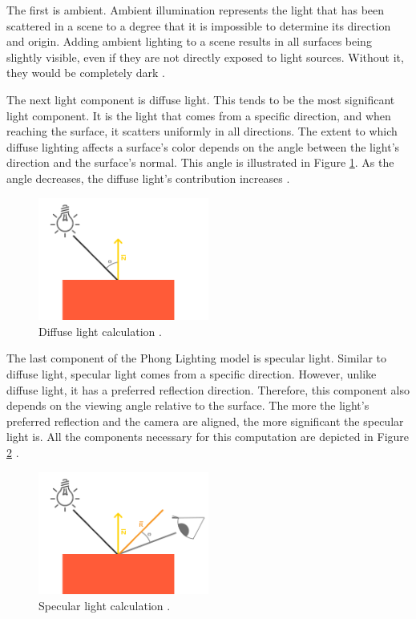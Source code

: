 \documentclass[
  digital,     %
  oneside,     %
  nosansbold,  %
  nocolorbold, %
  lof,         %
  lot,         %
]{fithesis4}
\begin{document}
The first is ambient. Ambient illumination represents the light that has been scattered
in a scene to a degree that it is impossible to determine its direction and origin.
Adding ambient lighting to a scene results in all surfaces being slightly visible,
even if they are not directly exposed
to light sources. Without it, they would be completely dark \cite[p.208]{opengl-book}.

The next light component is diffuse light. This tends to be the most significant light component.
It is the light that comes from a specific direction, and when reaching the surface,
it scatters uniformly in all directions. The extent to which diffuse lighting affects
a surface's color depends on the angle between the light's direction and the surface's normal.
This angle is illustrated in Figure \ref{fig:diffuse}. As the angle decreases,
the diffuse light's contribution increases \cite{phong}\cite[p.208]{opengl-book}.
\begin{figure}[H]
    \centering
    \includegraphics[width=0.5\textwidth]{images/diffuse_light.png}
    \caption{Diffuse light calculation \cite{learnopengl-lighting}.}
    \label{fig:diffuse}
\end{figure}

The last component of the Phong Lighting model is specular light.
Similar to diffuse light, specular light comes from a specific direction.
However, unlike diffuse light, it has a preferred reflection direction.
Therefore, this component also depends on the viewing angle relative to the surface.
The more the light's preferred reflection and the camera are aligned, the
more significant the specular light is. All the components necessary for this
computation are depicted in Figure \ref{fig:specular} \cite{phong}\cite[p.208]{opengl-book}.
\begin{figure}[H]
    \centering
    \includegraphics[width=0.5\textwidth]{images/specular_light.png}
    \caption{Specular light calculation \cite{learnopengl-lighting}.}
    \label{fig:specular}
\end{figure}
\end{document}
